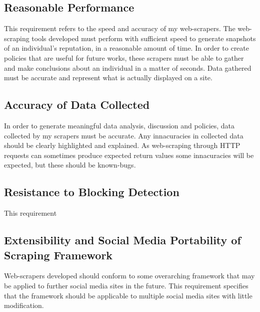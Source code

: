 \subsection{Reasonable Performance}

This requirement refers to the speed and accuracy of my web-scrapers. The web-scraping tools developed must perform with sufficient speed to generate snapshots of an individual's reputation, in a reasonable amount of time. In order to create policies that are useful for future works, these scrapers must be able to gather and make conclusions about an individual in a matter of seconds. Data gathered must be accurate and represent what is actually displayed on a site. 

\subsection{Accuracy of Data Collected}

In order to generate meaningful data analysis, discussion and policies, data collected by my scrapers must be accurate. Any innacuracies in collected data should be clearly highlighted and explained. As web-scraping through HTTP requests can sometimes produce expected return values some innacuracies will be expected, but these should be known-bugs. 

\subsection{Resistance to Blocking Detection}

This requirement 

\subsection{Extensibility and Social Media Portability of Scraping Framework}

Web-scrapers developed should conform to some overarching framework that may be applied to further social media sites in the future. This requirement specifies that the framework should be applicable to multiple social media sites with little modification. 



